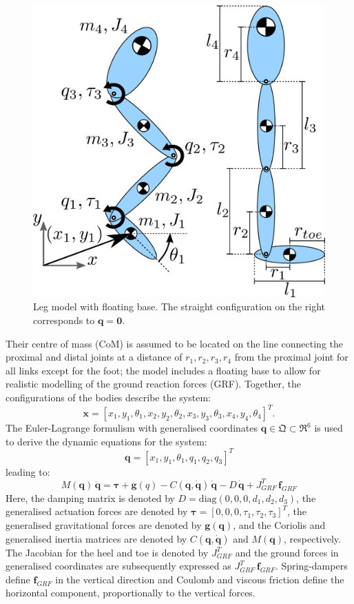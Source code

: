 \documentclass[letterpaper, 10 pt, conference]{ieeeconf}  %
\begin{document}
	\begin{figure}[ht]
		\centering
		\includegraphics[width=0.7\linewidth]{Leg_3DoF_model}
		\caption{Leg model with floating base. The straight configuration on
			the right corresponds to $\mathbf{q} = \mathbf{0}$.}
		\label{fig:Leg_3DoF_model}
	\end{figure}
	
	Their centre of mass (CoM) is assumed to be located on the line connecting the proximal and distal joints at a distance of $r_1,r_2,r_3,r_4$ from the proximal joint for all links except for the foot; the model includes a floating base to allow for realistic modelling of the ground reaction forces (GRF). Together, the configurations of the bodies describe the system:
	\begin{equation}
	\mathbf{x} = [x_1,y_1,\theta_1,x_2,y_2,\theta_2, x_3,y_3,\theta_3,x_4,y_4,\theta_4]^T. 
	\end{equation}
	The Euler-Lagrange formulism with generalised coordinates $\mathbf{q} \in \mathfrak{Q} \subset \mathfrak{R}^{6}$ is used to derive the dynamic equations for the system:
	\begin{equation}
	\mathbf{q} = [x_1,y_1,\theta_1,q_1,q_2,q_3]^T
	\label{eq:q}
	\end{equation}
	leading to:
	\begin{equation}
	M(\mathbf{q}) \, \mathbf{\ddot q} = \mathbf{\boldsymbol{\tau}} + \mathbf{g}(q) - C(\mathbf{q, \dot q}) \, \mathbf{\dot q} - D \, \mathbf{\dot q} + J_{GRF}^T \, \mathbf{f}_{GRF}
	\label{eq:fwddyn}
	\end{equation}
	Here, the damping matrix is denoted by $D = \mathrm{diag} (0,0,0,d_1,d_2,d_3)$, the generalised actuation forces are denoted by $\boldsymbol{\tau} = [0,0,0,\tau_1,\tau_2,\tau_3]^T$, the generalised gravitational forces are denoted by $\mathbf{g(q)}$, and the Coriolis and generalised inertia matrices are denoted by $C\mathbf{(q, \dot q)}$ and $M(\mathbf{q})$, respectively. The Jacobian for the heel and toe is denoted by $J_{GRF}^T$ and the ground forces in generalised coordinates are subsequently expressed as $J_{GRF}^T \, \mathbf{f}_{GRF}$. Spring-dampers define $\mathbf{f}_{GRF}$ in the vertical direction and Coulomb and viscous friction define the horizontal component, proportionally to the vertical forces.
	
\end{document}
